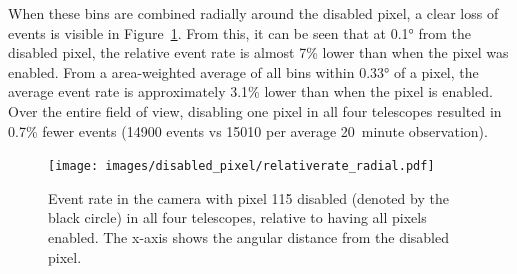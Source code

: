 {    When these bins are combined radially around the disabled pixel, a clear loss of events is visible in Figure~\ref{fig:dpix_rel_radial}.
    From this, it can be seen that at \ang{0.1} from the disabled pixel, the relative event rate is almost 7\% lower than when the pixel was enabled.
    From a area-weighted average of all bins within \ang{0.33} of a pixel, the average event rate is approximately 3.1\% lower than when the pixel is enabled.
    Over the entire field of view, disabling one pixel in all four telescopes resulted in 0.7\% fewer events (14900 events vs 15010 per average \SI{20}{minute} observation).
    
    \begin{figure}[!ht]
      \centering
      \texttt{[image: images/disabled\_pixel/relativerate\_radial.pdf]}
      \caption[Relative Event Rate After Disabling Camera Pixels]{
        Event rate in the camera with pixel 115 disabled (denoted by the black circle) in all four telescopes, relative to having all pixels enabled.
        The x-axis shows the angular distance from the disabled pixel.
      }
      \label{fig:dpix_rel_radial}
    \end{figure}

    
    
}
